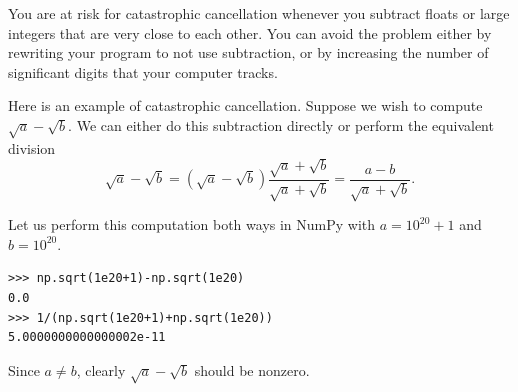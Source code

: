 You are at risk for catastrophic cancellation whenever you subtract floats or large integers that are very close to each other.
You can avoid the problem either by rewriting your program to not use subtraction, or by increasing the number of significant digits that your computer tracks.

Here is an example of catastrophic cancellation.
Suppose we wish to compute $\sqrt{a}-\sqrt{b}$. We can either do this subtraction directly or perform the equivalent division
\[
\sqrt{a}-\sqrt{b} = (\sqrt{a}-\sqrt{b})\frac{\sqrt{a}+\sqrt{b}}{\sqrt{a}+\sqrt{b}} = \frac{a-b}{\sqrt{a}+\sqrt{b}}.
\]

Let us perform this computation both ways in NumPy with $a=10^{20}+1$ and $b=10^{20}$.
\begin{lstlisting}
>>> np.sqrt(1e20+1)-np.sqrt(1e20)
0.0
>>> 1/(np.sqrt(1e20+1)+np.sqrt(1e20))
5.0000000000000002e-11
\end{lstlisting}
Since $a \neq b$, clearly $\sqrt{a}-\sqrt{b}$ should be nonzero. 


